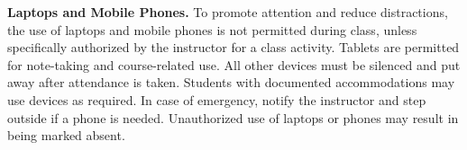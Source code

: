 \textbf{Laptops and Mobile Phones.} To promote attention and reduce distractions, the use of laptops and mobile phones is not permitted during class, unless specifically authorized by the instructor for a class activity. Tablets are permitted for note-taking and course-related use. All other devices must be silenced and put away after attendance is taken. Students with documented accommodations may use devices as required. In case of emergency, notify the instructor and step outside if a phone is needed. Unauthorized use of laptops or phones may result in being marked absent.
